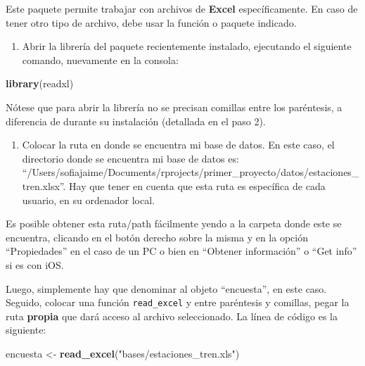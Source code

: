\documentclass[
]{article}
\newenvironment{Shaded}{\begin{snugshade}}{\end{snugshade}}
\newcommand{\FunctionTok}[1]{\textcolor[rgb]{0.13,0.29,0.53}{\textbf{#1}}}
\newcommand{\NormalTok}[1]{#1}
\newcommand{\OtherTok}[1]{\textcolor[rgb]{0.56,0.35,0.01}{#1}}
\newcommand{\StringTok}[1]{\textcolor[rgb]{0.31,0.60,0.02}{#1}}
\providecommand{\tightlist}{%
  \setlength{\itemsep}{0pt}\setlength{\parskip}{0pt}}
\begin{document}
Este paquete permite trabajar con archivos de \textbf{Excel} específicamente. En caso de tener otro tipo de archivo, debe usar la función o paquete indicado.

\begin{enumerate}
\def\labelenumi{\arabic{enumi}.}
\setcounter{enumi}{2}
\tightlist
\item
  Abrir la librería del paquete recientemente instalado, ejecutando el siguiente comando, nuevamente en la consola:
\end{enumerate}

\begin{Shaded}
\begin{Highlighting}[]
\FunctionTok{library}\NormalTok{(readxl)}
\end{Highlighting}
\end{Shaded}

Nótese que para abrir la librería no se precisan comillas entre los paréntesis, a diferencia de durante su instalación (detallada en el paso 2).

\begin{enumerate}
\def\labelenumi{\arabic{enumi}.}
\setcounter{enumi}{3}
\tightlist
\item
  Colocar la ruta en donde se encuentra mi base de datos. En este caso, el directorio donde se encuentra mi base de datos es: ``/Users/sofiajaime/Documents/rprojects/primer\_proyecto/datos/estaciones\_tren.xlsx''. Hay que tener en cuenta que esta ruta es específica de cada usuario, en su ordenador local.
\end{enumerate}

Es posible obtener esta ruta/path fácilmente yendo a la carpeta donde este se encuentra, clicando en el botón derecho sobre la misma y en la opción ``Propiedades'' en el caso de un PC o bien en ``Obtener información'' o ``Get info'' si es con iOS.

Luego, simplemente hay que denominar al objeto ``encuesta'', en este caso. Seguido, colocar una función \texttt{read\_excel} y entre paréntesis y comillas, pegar la ruta \textbf{propia} que dará acceso al archivo seleccionado. La línea de código es la siguiente:

\begin{Shaded}
\begin{Highlighting}[]
\NormalTok{encuesta }\OtherTok{\textless{}{-}} \FunctionTok{read\_excel}\NormalTok{(}\StringTok{"bases/estaciones\_tren.xls"}\NormalTok{)}
\end{Highlighting}
\end{Shaded}
\end{document}
